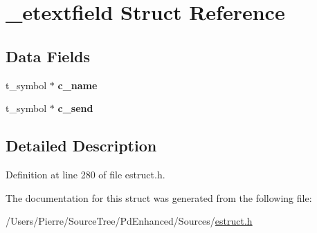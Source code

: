 \hypertarget{struct__etextfield}{\section{\-\_\-etextfield Struct Reference}
\label{struct__etextfield}
}
\subsection*{Data Fields}
\begin{DoxyCompactItemize}
\item 
\hypertarget{struct__etextfield_a6b1d595c3eed41231261cc949de6c059}{t\-\_\-symbol $\ast$ {\bfseries c\-\_\-name}}\label{struct__etextfield_a6b1d595c3eed41231261cc949de6c059}

\item 
\hypertarget{struct__etextfield_a8b8515ab22b24ef7b726fc06af1254fe}{t\-\_\-symbol $\ast$ {\bfseries c\-\_\-send}}\label{struct__etextfield_a8b8515ab22b24ef7b726fc06af1254fe}

\end{DoxyCompactItemize}


\subsection{Detailed Description}


Definition at line 280 of file estruct.\-h.



The documentation for this struct was generated from the following file\-:\begin{DoxyCompactItemize}
\item 
/\-Users/\-Pierre/\-Source\-Tree/\-Pd\-Enhanced/\-Sources/\hyperlink{estruct_8h}{estruct.\-h}\end{DoxyCompactItemize}
